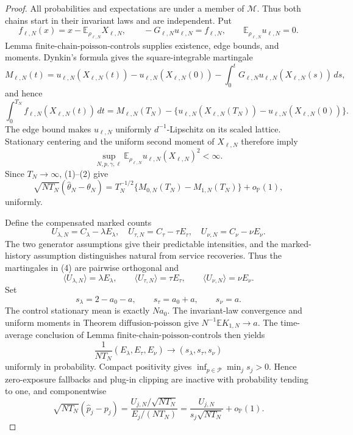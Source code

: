 \documentclass{article}
\begin{document}
\begin{proof}
All probabilities and expectations are under a member of \(\mathcal M\).  Thus both chains start in their invariant laws and are independent.  Put
\[
 f_{\ell,N}(x)=x-\mathbb E_{\rho_{\ell,N}}X_{\ell,N},
 \qquad
 -G_{\ell,N}u_{\ell,N}=f_{\ell,N},
 \qquad
 \mathbb E_{\rho_{\ell,N}}u_{\ell,N}=0.
\]
Lemma \(\mathrm{finite\mbox{-}chain\mbox{-}poisson\mbox{-}controls}\) supplies existence, edge bounds, and moments.  Dynkin's formula gives the square-integrable martingale
\[
 M_{\ell,N}(t)=u_{\ell,N}(X_{\ell,N}(t))-u_{\ell,N}(X_{\ell,N}(0))
 -\int_0^tG_{\ell,N}u_{\ell,N}(X_{\ell,N}(s))\,ds,
\]
and hence
\[
 \int_0^{T_N}f_{\ell,N}(X_{\ell,N}(t))\,dt
 =M_{\ell,N}(T_N)
 -\{u_{\ell,N}(X_{\ell,N}(T_N))-u_{\ell,N}(X_{\ell,N}(0))\}. \tag{1}
\]
The edge bound makes \(u_{\ell,N}\) uniformly \(d^{-1}\)-Lipschitz on its scaled lattice.  Stationary centering and the uniform second moment of \(X_{\ell,N}\) therefore imply
\[
 \sup_{N,p,\gamma,\ell}
 \mathbb E_{\rho_{\ell,N}}u_{\ell,N}(X_{\ell,N})^2<\infty.    \tag{2}
\]
Since \(T_N\to\infty\), (1)--(2) give
\[
 \sqrt{NT_N}(\widehat\theta_N-\theta_N)
 =T_N^{-1/2}\{M_{0,N}(T_N)-M_{1,N}(T_N)\}+o_{\mathbb P}(1),   \tag{3}
\]
uniformly.

Define the compensated marked counts
\[
 U_{\lambda,N}=C_\lambda-\lambda E_\lambda,
 \quad
 U_{\tau,N}=C_\tau-\tau E_\tau,
 \quad
 U_{\nu,N}=C_\nu-\nu E_\nu.                                  \tag{4}
\]
The two generator assumptions give their predictable intensities, and the marked-history assumption distinguishes natural from service recoveries.  Thus the martingales in (4) are pairwise orthogonal and
\[
 \langle U_{\lambda,N}\rangle=\lambda E_\lambda,
 \qquad
 \langle U_{\tau,N}\rangle=\tau E_\tau,
 \qquad
 \langle U_{\nu,N}\rangle=\nu E_\nu.                        \tag{5}
\]
Set
\[
 s_\lambda=2-a_0-a,
 \qquad s_\tau=a_0+a,
 \qquad s_\nu=a.
\]
The control stationary mean is exactly \(Na_0\).  The invariant-law convergence and uniform moments in Theorem \(\mathrm{diffusion\mbox{-}poisson}\) give \(N^{-1}\mathbb E K_{1,N}\to a\).  The time-average conclusion of Lemma \(\mathrm{finite\mbox{-}chain\mbox{-}poisson\mbox{-}controls}\) then yields
\[
 \frac1{NT_N}(E_\lambda,E_\tau,E_\nu)
 \longrightarrow(s_\lambda,s_\tau,s_\nu)                    \tag{6}
\]
uniformly in probability.  Compact positivity gives \(\inf_{p\in\mathcal P}\min_j s_j>0\).  Hence zero-exposure fallbacks and plug-in clipping are inactive with probability tending to one, and componentwise
\[
 \sqrt{NT_N}(\widehat p_j-p_j)
 =\frac{U_{j,N}/\sqrt{NT_N}}{E_j/(NT_N)}
 =\frac{U_{j,N}}{s_j\sqrt{NT_N}}+o_{\mathbb P}(1).             \tag{7}
\]


\end{proof}
\end{document}
